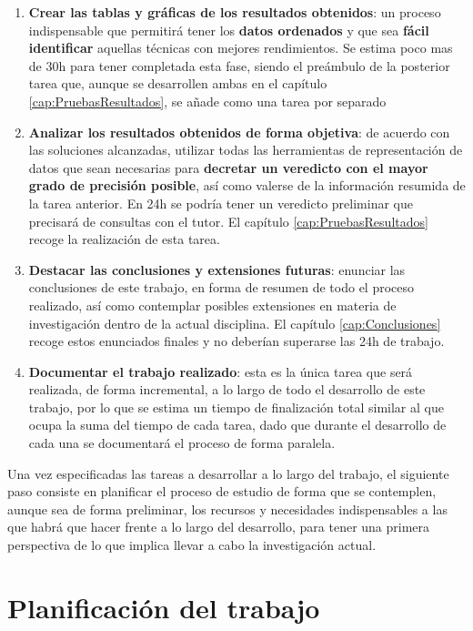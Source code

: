 \begin{enumerate}
	\item  \label{tarea8} \textbf{Crear las tablas y gráficas de los resultados obtenidos}: un proceso  indispensable que permitirá tener los \textbf{datos ordenados} y que sea \textbf{fácil identificar} aquellas técnicas con mejores rendimientos. Se estima poco mas de 30h para tener completada esta fase, siendo el preámbulo de la posterior tarea que, aunque se desarrollen ambas en el capítulo \ref{cap:PruebasResultados}, se añade como una tarea por separado
	
	\item \label{tarea9} \textbf{Analizar los resultados obtenidos de forma objetiva}: de acuerdo con las soluciones alcanzadas, utilizar todas las herramientas de representación de datos que sean necesarias para \textbf{decretar un veredicto con el mayor grado de precisión posible}, así como valerse de la información resumida de la tarea anterior. En 24h se podría tener un veredicto preliminar que precisará de consultas con el tutor. El capítulo \ref{cap:PruebasResultados} recoge la realización de esta tarea.
	
	\item  \label{tarea10} \textbf{Destacar las conclusiones y extensiones futuras}: enunciar las conclusiones de este trabajo, en forma de resumen de todo el proceso realizado, así como contemplar posibles extensiones en materia de investigación dentro de la actual disciplina. El capítulo \ref{cap:Conclusiones} recoge estos enunciados finales y no deberían superarse las 24h de trabajo.
	
	\item  \label{tarea11} \textbf{Documentar el trabajo realizado}: esta es la única tarea que será realizada, de forma incremental, a lo largo de todo el desarrollo de este trabajo, por lo que se estima un tiempo de finalización total similar al que ocupa la suma del tiempo de cada tarea, dado que durante el desarrollo de cada una se documentará el proceso de forma paralela.
\end{enumerate}

Una vez especificadas las tareas a desarrollar a lo largo del trabajo, el siguiente paso consiste en planificar el proceso de estudio de forma que se contemplen, aunque sea de forma preliminar, los recursos y necesidades indispensables a las que habrá que hacer frente a lo largo del desarrollo, para tener una primera perspectiva de lo que implica llevar a cabo la investigación actual.

\section{Planificación del trabajo} 

